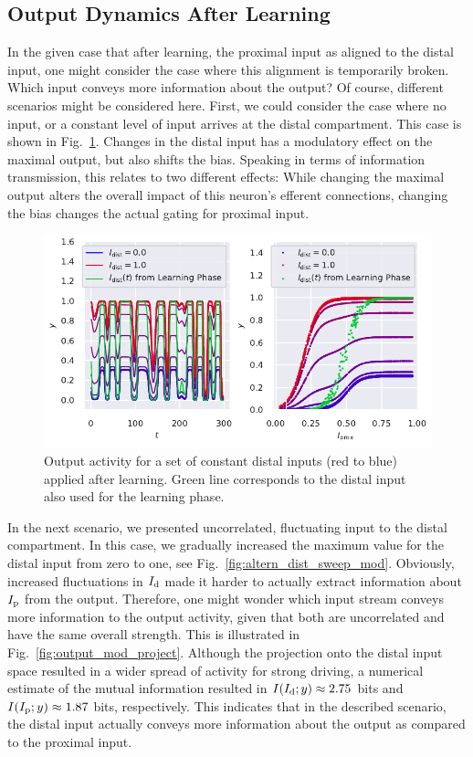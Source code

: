 \documentclass[10pt,a4paper]{article}
\begin{document}
\subsection{Output Dynamics After Learning}
In the given case that after learning, the proximal input as aligned to the distal input, one might consider the case where this alignment is temporarily broken. Which input conveys more information about the output? Of course, different scenarios might be considered here. First, we could consider the case where no input, or a constant level of input arrives at the distal compartment. This case is shown in Fig.~\ref{fig:const_dist_sweep_mod}. Changes in the distal input has a modulatory effect on the maximal output, but also shifts the bias. Speaking in terms of information transmission, this relates to two different effects: While changing the maximal output alters the overall impact of this neuron's efferent connections, changing the bias changes the actual gating for proximal input. 
\begin{figure}
	\centering
	\includegraphics[width=\textwidth]{./figures/output_modulation_sweep.pdf}
	\caption{Output activity for a set of constant distal inputs (red to blue) applied after learning. Green line corresponds to the distal input also used for the learning phase.}
	\label{fig:const_dist_sweep_mod}
\end{figure}
In the next scenario, we presented uncorrelated, fluctuating input to the distal compartment. In this case, we gradually increased the maximum value for the distal input from zero to one, see Fig.~\ref{fig:altern_dist_sweep_mod}. Obviously, increased fluctuations in $I_{\rm d}$ made it harder to actually extract information about $I_{\rm p}$ from the output. Therefore, one might wonder which input stream conveys more information to the output activity, given that both are uncorrelated and have the same overall strength. This is illustrated in Fig.~\ref{fig:output_mod_project}. Although the projection onto the distal input space resulted in a wider spread of activity for strong driving, a numerical estimate of the mutual information resulted in $I(I_{\rm d};y) \approx 2.75$ bits and $I(I_{\rm p};y) \approx 1.87$ bits, respectively. This indicates that in the described scenario, the distal input actually conveys more information about the output as compared to the proximal input.
\end{document}
